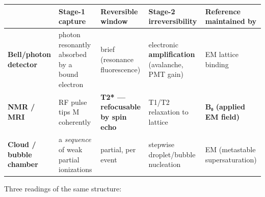 \documentclass[
]{article}
\newcounter{none} %
\begin{document}
{\def\LTcaptype{none} %
\begin{longtable}[]{@{}
  >{\raggedright\arraybackslash}p{}
  >{\raggedright\arraybackslash}p{}
  >{\raggedright\arraybackslash}p{}
  >{\raggedright\arraybackslash}p{}
  >{\raggedright\arraybackslash}p{}@{}}
\toprule\noalign{}
\begin{minipage}[b]{\linewidth}\raggedright
\end{minipage} & \begin{minipage}[b]{\linewidth}\raggedright
Stage-1 capture
\end{minipage} & \begin{minipage}[b]{\linewidth}\raggedright
Reversible window
\end{minipage} & \begin{minipage}[b]{\linewidth}\raggedright
Stage-2 irreversibility
\end{minipage} & \begin{minipage}[b]{\linewidth}\raggedright
Reference maintained by
\end{minipage} \\
\midrule\noalign{}
\endhead
\bottomrule\noalign{}
\endlastfoot
\textbf{Bell/photon detector} & photon resonantly absorbed by a bound
electron & brief (resonance fluorescence) & electronic
\textbf{amplification} (avalanche, PMT gain) & EM lattice binding \\
\textbf{NMR / MRI} & RF pulse tips M coherently & \textbf{T2* ---
refocusable by spin echo} & T1/T2 relaxation to lattice & \textbf{B₀
(applied EM field)} \\
\textbf{Cloud / bubble chamber} & a \emph{sequence} of weak partial
ionizations & partial, per event & stepwise droplet/bubble nucleation &
EM (metastable supersaturation) \\
\end{longtable}
}

Three readings of the same structure:
\end{document}
